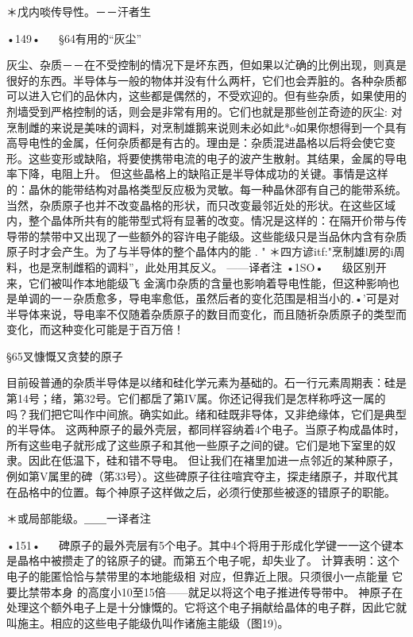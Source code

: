 {＊戊内啖传导性。－－汗者生

•149•
  
§64有用的“灰尘”

灰尘、杂质－－在不受控制的情况下是坏东西，但如果以汒确的比例出现，则真是很好的东西。半导体与一般的物体并没有什么两杆，它们也会弄脏的。各种杂质都可以进入它们的品休内，这些都是偶然的，不受欢迎的。但有些杂质，如果使用的剂墙受到严格控制的话，则会是非常有用的。它们也就是那些创芷奇迹的灰尘:
对烹制雌的来说是美味的调料，对烹制雄鹅来说则未必如此*o如果你想得到一个具有高导电性的金属，任何杂质都是有古的。理由是：杂质混进晶格以后将会使它变形。这些变形或缺陷，将要使携带电流的电子的波产生散射。其结果，金属的导电率下降，电阻上升。
但这些晶格上的缺陷正是半导体成功的关键。事情是这样的：晶休的能带结构对晶格类型反应极为灵敏。每一种晶休邵有自己的能带系统。
当然，杂质原子也并不改变晶格的形状，而只改变最邻近处的形状。在这些区域内，整个晶体所共有的能带型式将有显著的改变。情况是这样的：在隔开价带与传导带的禁带中又出现了一些额外的容许电子能级。这些能级只是当品休内含有杂质原子时才会产生。为了与半导体的整个晶体内的能
	.	"
＊四方谚itf:"烹制雄l房的i周料，也是烹制雌稻的调料”，此处用其反义。
——译者注
•1SO•
  
级区别开来，它们被叫作本地能级飞
金漓巾杂质的含量也影响着导电性能，但这种影响也是单调的一－杂质愈多，导电率愈低，虽然后者的变化范围是相当小的.•'可是对半导体来说，导电率不仅随着杂质原子的数目而变化，而且随祈杂质原子的类型而变化，而这种变化可能是于百万倍！

§65叉慷慨又贪婪的原子

目前砓普通的杂质半导体是以绪和硅化学元素为基础的。石一行元素周期表：硅是第14号；绪，第32号。它们都扂了第IV属。你还记得我们是怎样称呼这一属的吗？我们把它叫作中间旅。确实如此。绪和硅既非导体，又非绝缘体，它们是典型的半导体。
这两种原子的最外壳层，都同样容纳着4个电子。当原子构成晶体时，所有这些电子就形成了这些原子和其他一些原子之间的键。它们是地下室里的奴隶。因此在低温下，硅和错不导电。
但让我们在褚里加进一点邻近的某种原子，例如第V属里的碑（笫33号）。这些碑原子往往喧宾夺主，探走绪原子，并取代其在品格中的位置。每个神原子这样做之后，必须行使那些被逐的错原子的职能。

＊或局部能级。＿＿一译者注

•151•
  
碑原子的最外壳层有5个电子。其中4个将用于形成化学键一一这个键本是晶格中被攒走了的铭原子的键。而第五个电子呢，却失业了。
计算表明：这个电子的能匿恰恰与禁带里的本地能级相
	对应，但靠近上限。只须很小一点能量	它要比禁带本身
的高度小10至15倍——就足以将这个电子推进传导带中。
神原子在处理这个额外电子上是十分慷慨的。它将这个电子捐献给晶体的电子群，因此它就叫施主。相应的这些电子能级仇叫作诸施主能级（图19)。

}
